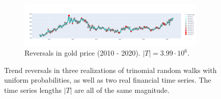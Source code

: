 \documentclass[../trend-calculus.tex]{subfiles}
\begin{document}
\begin{figure}
    \begin{subfigure}{\textwidth}
      \includegraphics[width=0.98\textwidth]{graphics/tc-gold.png}
      \caption{Reversals in gold price (2010 - 2020). $|T| = 3.99 \cdot 10^6$.}
    \end{subfigure}
    \caption{Trend reversals in three realizations of trinomial random walks with uniform probabilities, as well as two real financial time series.
    The time series lengths $|T|$ are all of the same magnitude.}
    \label{fig:trendcalculus}
  \end{figure}
\end{document}
